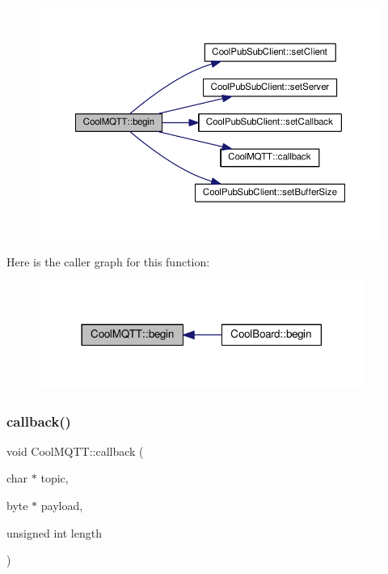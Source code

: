 \begin{figure}[H]
\begin{center}
\leavevmode
\includegraphics[width=350pt]{d0/dd0/class_cool_m_q_t_t_ac9248808641ebf3054ed0620ea9d0100_cgraph}
\end{center}
\end{figure}
Here is the caller graph for this function\+:\nopagebreak
\begin{figure}[H]
\begin{center}
\leavevmode
\includegraphics[width=302pt]{d0/dd0/class_cool_m_q_t_t_ac9248808641ebf3054ed0620ea9d0100_icgraph}
\end{center}
\end{figure}
\mbox{\label{class_cool_m_q_t_t_a30d82ad665bfb603f46ecdbc290775df}} 
\subsubsection{\texorpdfstring{callback()}{callback()}}
{\footnotesize\ttfamily void Cool\+M\+Q\+T\+T\+::callback (\begin{DoxyParamCaption}\item[{char $\ast$}]{topic,  }\item[{byte $\ast$}]{payload,  }\item[{unsigned int}]{length }\end{DoxyParamCaption})}

